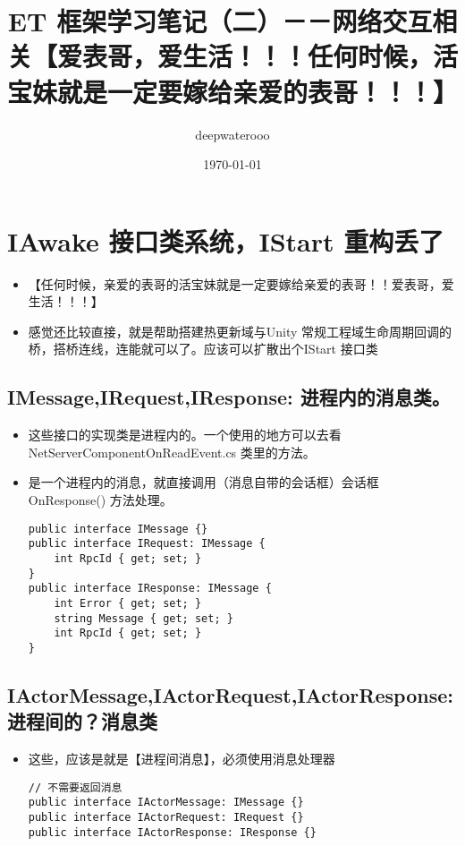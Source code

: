 \documentclass[9pt, b5paper]{article}
\author{deepwaterooo}
\date{\today}
\title{ET 框架学习笔记（二）－－网络交互相关【爱表哥，爱生活！！！任何时候，活宝妹就是一定要嫁给亲爱的表哥！！！】}
\begin{document}
\maketitle
\tableofcontents


\section{IAwake 接口类系统，IStart 重构丢了}
\label{sec-1}
\begin{itemize}
\item 【任何时候，亲爱的表哥的活宝妹就是一定要嫁给亲爱的表哥！！爱表哥，爱生活！！！】
\item 感觉还比较直接，就是帮助搭建热更新域与Unity 常规工程域生命周期回调的桥，搭桥连线，连能就可以了。应该可以扩散出个IStart 接口类
\end{itemize}
\subsection{IMessage,IRequest,IResponse: 进程内的消息类。}
\label{sec-1-1}
\begin{itemize}
\item 这些接口的实现类是进程内的。一个使用的地方可以去看 NetServerComponentOnReadEvent.cs 类里的方法。
\item 是一个进程内的消息，就直接调用（消息自带的会话框）会话框 OnResponse() 方法处理。
\begin{verbatim}
public interface IMessage {}
public interface IRequest: IMessage {
    int RpcId { get; set; }
}
public interface IResponse: IMessage {
    int Error { get; set; }
    string Message { get; set; }
    int RpcId { get; set; }
}
\end{verbatim}
\end{itemize}
\subsection{IActorMessage,IActorRequest,IActorResponse: 进程间的？消息类}
\label{sec-1-2}
\begin{itemize}
\item 这些，应该是就是【进程间消息】，必须使用消息处理器
\begin{verbatim}
// 不需要返回消息
public interface IActorMessage: IMessage {}
public interface IActorRequest: IRequest {}
public interface IActorResponse: IResponse {}
\end{verbatim}
\end{itemize}
\end{document}
